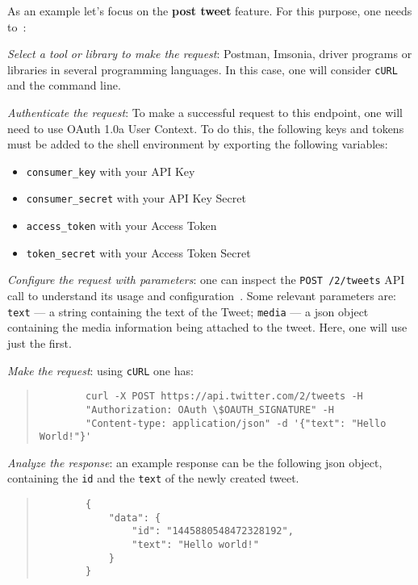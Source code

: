 As an example let's focus on the \textbf{post tweet} feature. For this purpose, one needs
to~\cite{twitterManageTweetQuickStart}:
\begin{enum-c}
\item \emph{Select a tool or library to make the request}:
  Postman, Imsonia,
  driver programs or libraries in several programming languages. In this case,
  one will consider \texttt{cURL} and the command line.
\item \emph{Authenticate the request}:
  To make a successful request to this endpoint, one will need to use OAuth 1.0a
  User Context. To do this, the following keys and tokens must be added to the
  shell environment by exporting the following variables:
  \begin{itemize}
    \item \texttt{consumer\_key} with your API Key
    \item \texttt{consumer\_secret} with your API Key Secret
    \item \texttt{access\_token} with your Access Token
    \item \texttt{token\_secret} with your Access Token Secret
    \end{itemize}
  \item \emph{Configure the request with parameters}: one can inspect the
    \texttt{POST /2/tweets} API call to understand its usage and
    configuration~\cite{twitterAPIRefPostTweet}. Some relevant parameters are:
    \texttt{text} --- a string containing the text of the Tweet; \texttt{media}
    --- a \gls{json} object containing the media information being attached to
    the tweet. Here, one will use just the first.
  \item \emph{Make the request}: using \texttt{cURL} one has:
    \begin{quote}
      \onehalfspacing
        \begin{verbatim}
        curl -X POST https://api.twitter.com/2/tweets -H 
        "Authorization: OAuth \$OAUTH_SIGNATURE" -H 
        "Content-type: application/json" -d '{"text": "Hello World!"}'
        \end{verbatim}
    \end{quote}
    \vspace{-7mm}
%
  \item \emph{Analyze the response}: an example response can be the following
    \gls{json} object,
    containing the \texttt{id} and the \texttt{text} of the newly created tweet.
    \begin{quote}
      \onehalfspacing
        \begin{verbatim}
        {
            "data": {
                "id": "1445880548472328192",
                "text": "Hello world!"
            }
        }
        \end{verbatim}
    \end{quote}
    \vspace{-7mm}
\end{enum-c}

